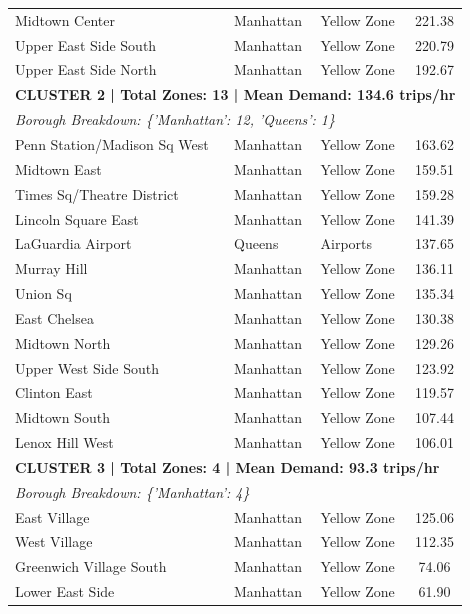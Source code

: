 \documentclass[11pt,a4paper]{article}
\begin{document}
\begin{table}[htbp]
\begin{tabular}{lllc}
        Midtown Center & Manhattan & Yellow Zone & 221.38 \\
        Upper East Side South & Manhattan & Yellow Zone & 220.79 \\
        Upper East Side North & Manhattan & Yellow Zone & 192.67 \\
        \midrule
        \multicolumn{4}{l}{\textbf{CLUSTER 2 | Total Zones: 13 | Mean Demand: 134.6 trips/hr}} \\
        \multicolumn{4}{l}{\textit{Borough Breakdown: \{'Manhattan': 12, 'Queens': 1\}}} \\
        \midrule
        Penn Station/Madison Sq West & Manhattan & Yellow Zone & 163.62 \\
        Midtown East & Manhattan & Yellow Zone & 159.51 \\
        Times Sq/Theatre District & Manhattan & Yellow Zone & 159.28 \\
        Lincoln Square East & Manhattan & Yellow Zone & 141.39 \\
        LaGuardia Airport & Queens & Airports & 137.65 \\
        Murray Hill & Manhattan & Yellow Zone & 136.11 \\
        Union Sq & Manhattan & Yellow Zone & 135.34 \\
        East Chelsea & Manhattan & Yellow Zone & 130.38 \\
        Midtown North & Manhattan & Yellow Zone & 129.26 \\
        Upper West Side South & Manhattan & Yellow Zone & 123.92 \\
        Clinton East & Manhattan & Yellow Zone & 119.57 \\
        Midtown South & Manhattan & Yellow Zone & 107.44 \\
        Lenox Hill West & Manhattan & Yellow Zone & 106.01 \\
        \midrule
        \multicolumn{4}{l}{\textbf{CLUSTER 3 | Total Zones: 4 | Mean Demand: 93.3 trips/hr}} \\
        \multicolumn{4}{l}{\textit{Borough Breakdown: \{'Manhattan': 4\}}} \\
        \midrule
        East Village & Manhattan & Yellow Zone & 125.06 \\
        West Village & Manhattan & Yellow Zone & 112.35 \\
        Greenwich Village South & Manhattan & Yellow Zone & 74.06 \\
        Lower East Side & Manhattan & Yellow Zone & 61.90 \\

\end{tabular}
\end{table}
\end{document}

